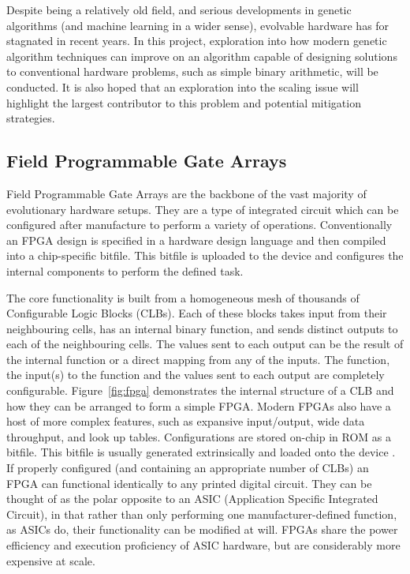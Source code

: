 Despite being a relatively old field, and serious developments in genetic
algorithms (and machine learning in a wider sense), evolvable hardware has for
stagnated in recent years. In this project, exploration into how modern
genetic algorithm techniques can improve on an algorithm capable of designing solutions
to conventional hardware problems, such as simple binary arithmetic, will
be conducted.
It is also hoped that an exploration into the scaling issue will highlight
the largest contributor to this problem and potential mitigation
strategies.

\subsection{Field Programmable Gate Arrays \label{ss:FPGAs}}
Field Programmable Gate Arrays \cite{Kuon:2008:FAS:1454695.1454696}
are the backbone of the vast majority of evolutionary
hardware setups. They are a type of integrated circuit which can be
configured after manufacture to perform a variety of operations. Conventionally
an FPGA design is specified in a hardware design language and then compiled into a chip-specific bitfile.
This bitfile is uploaded to the device and configures the internal components
to perform the defined task.

The core functionality is built from a homogeneous mesh of
thousands of Configurable Logic Blocks (CLBs).
Each of these blocks takes input from their
neighbouring cells, has an internal binary function, and sends distinct outputs
to each of the neighbouring cells. The values sent to each output can be the
result of the internal function or a direct mapping from any of the inputs. The function,
the input(s) to the function
and the values sent to each output are completely configurable. Figure~\ref{fig:fpga}
demonstrates the internal structure of a CLB and how they can be arranged to form a simple FPGA.
Modern FPGAs also have a host of more complex features, such as expansive input/output,
wide data throughput, and look up tables.
Configurations are stored on-chip in ROM as a bitfile. This bitfile is usually generated
extrinsically \cite{10.1007/978-3-540-46239-2_5} and loaded onto the device \cite{Kuon:2008:FAS:1454695.1454696}.
If properly configured (and containing an appropriate number of CLBs) an FPGA can
functional identically to any printed digital circuit. They can be thought of
as the polar opposite to an ASIC (Application Specific Integrated Circuit), in that
rather than only performing one manufacturer-defined function, as ASICs do,
their functionality can be modified at will.
FPGAs share the power efficiency and execution proficiency of ASIC hardware, but
are considerably more expensive at scale.

